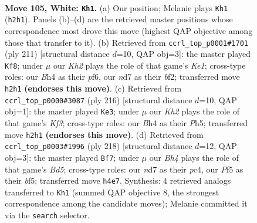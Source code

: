 \documentclass[11pt]{article}
\begin{document}
\clearpage

\begin{figure}[p]\centering
\begin{subfigure}{0.46\textwidth}\centering
\resizebox{\linewidth}{!}{%
\newchessgame
\chessboard[
  setfen={7k/3n4/8/5P2/p6B/P6P/7K/8 w - - 29 105},
  showmover=false,
  pgfstyle=straightmove, color=movearrow, markmove={h2-h1}
]}
\caption{}
\end{subfigure}\hfill
\begin{subfigure}{0.46\textwidth}\centering
\resizebox{\linewidth}{!}{%
\newchessgame
\chessboard[
  setfen={4k3/2K2p1p/5P1P/8/8/5p2/5B2/8 b - - 41 106},
  showmover=false,
  pgfstyle=straightmove, color=movearrow, markmove={e8-f8}
]}
\caption{}
\end{subfigure}
\\[4pt]
\begin{subfigure}{0.46\textwidth}\centering
\resizebox{\linewidth}{!}{%
\newchessgame
\chessboard[
  setfen={8/6k1/3p4/p6P/2P4P/5K2/8/8 w - - 0 109},
  showmover=false,
  pgfstyle=straightmove, color=movearrow, markmove={f3-e3}
]}
\caption{}
\end{subfigure}\hfill
\begin{subfigure}{0.46\textwidth}\centering
\resizebox{\linewidth}{!}{%
\newchessgame
\chessboard[
  setfen={8/2k5/8/1p1B1b2/1PpP4/4K3/8/8 w - - 1 110},
  showmover=false,
  pgfstyle=straightmove, color=movearrow, markmove={d5-f7}
]}
\caption{}
\end{subfigure}
\caption{\textbf{Move 105, White: \texttt{Kh1}.} (a) Our position; Melanie plays \texttt{Kh1} (\texttt{h2h1}). Panels (b)--(d) are the retrieved master positions whose correspondence most drove this move (highest QAP objective among those that transfer to it). (b) Retrieved from \texttt{ccrl\_top\_p0001\#1701} (ply 211) [structural distance $d$=10, QAP obj=3]: the master played \texttt{Kf8}; under $\mu$ our \emph{Kh2} plays the role of that game's \emph{Ke1}; cross-type roles: our \emph{B}h4 as their \emph{p}f6, our \emph{n}d7 as their \emph{b}f2; transferred move \texttt{h2h1} \textbf{(endorses this move)}. (c) Retrieved from \texttt{ccrl\_top\_p0000\#3087} (ply 216) [structural distance $d$=10, QAP obj=1]: the master played \texttt{Ke3}; under $\mu$ our \emph{Kh2} plays the role of that game's \emph{Kf3}; cross-type roles: our \emph{B}h4 as their \emph{P}h5; transferred move \texttt{h2h1} \textbf{(endorses this move)}. (d) Retrieved from \texttt{ccrl\_top\_p0003\#1996} (ply 218) [structural distance $d$=12, QAP obj=3]: the master played \texttt{Bf7}; under $\mu$ our \emph{Bh4} plays the role of that game's \emph{Bd5}; cross-type roles: our \emph{n}d7 as their \emph{p}c4, our \emph{P}f5 as their \emph{b}f5; transferred move \texttt{h4e7}. Synthesis: 4 retrieved analogs transferred to \texttt{Kh1} (summed QAP objective 8, the strongest correspondence among the candidate moves); Melanie committed it via the \texttt{search} selector.}
\label{fig:thought-m208}
\end{figure}
\end{document}
